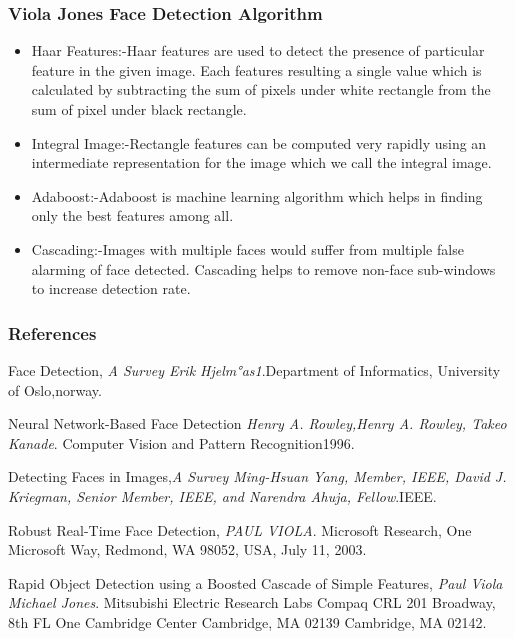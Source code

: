 \documentclass{beamer}
\begin{document}
\begin{frame}[label=main]
\frametitle{Viola Jones Face Detection Algorithm}
\begin{itemize}
\item Haar Features:-Haar features are used to detect the presence of particular feature in the given image. Each features resulting a single value which is calculated by
subtracting the sum of pixels under white rectangle from the sum of pixel under black rectangle.

\item Integral Image:-Rectangle features can be computed very rapidly using an intermediate representation for the image which we call the integral image.

\item Adaboost:-Adaboost is machine learning algorithm which helps in finding only the best features among all.

\item Cascading:-Images with multiple faces would suffer from multiple false alarming of face detected. Cascading helps to remove non-face sub-windows to increase detection rate.

\end{itemize}

\end{frame}

\begin{frame}

\frametitle{References}
\begin{thebibliography}{4}

Face Detection,
\emph{A Survey Erik Hjelm°as1}.Department of Informatics, University of Oslo,norway.

Neural Network-Based Face Detection
\emph{Henry A. Rowley,Henry A. Rowley, Takeo Kanade}. Computer Vision and Pattern Recognition1996.

Detecting Faces in Images,\emph{A Survey Ming-Hsuan Yang, Member, IEEE, David J. Kriegman, Senior Member, IEEE, and Narendra Ahuja, Fellow}.IEEE.
 
Robust Real-Time Face Detection,
\emph{PAUL VIOLA}. Microsoft Research, One Microsoft Way, Redmond, WA 98052, USA, July 11, 2003.
 
Rapid Object Detection using a Boosted Cascade of Simple
Features,
\emph{Paul Viola Michael Jones}. Mitsubishi Electric Research Labs Compaq CRL 201 Broadway, 8th FL One Cambridge Center Cambridge, MA 02139 Cambridge, MA 02142.
  
\end{thebibliography}

\end{frame}

\end{document}
